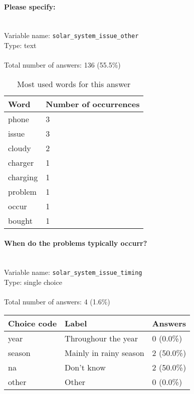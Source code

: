 \documentclass[11.5pt, a4paper]{scrartcl}
\begin{document}
\paragraph{Please specify:}
\  \\Variable name: \texttt{solar\_system\_issue\_other}\\
Type: text\\
\\Total number of answers: 136 (55.5\%)
\\[0.2em]\begin{table}[H]
 \begin{tabular}{p{4cm}|p{8cm}}
Word & Number of occurrences  \\
\hline
\cellcolor{mygray}phone&\cellcolor{mygray}3\\
\hline
issue&3\\
\hline
\cellcolor{mygray}cloudy&\cellcolor{mygray}2\\
\hline
charger&1\\
\hline
\cellcolor{mygray}charging&\cellcolor{mygray}1\\
\hline
problem&1\\
\hline
\cellcolor{mygray}occur&\cellcolor{mygray}1\\
\hline
bought&1\\
\hline
\end{tabular}
\caption{\label{tab:table-name} Most used words for this answer}
\end{table}
\paragraph{When do the problems typically occurr?}
\  \\Variable name: \texttt{solar\_system\_issue\_timing}\\
Type: single choice\\
\\Total number of answers: 4 (1.6\%)
\\[0.2em] \begin{tabular}{p{4cm}|p{8cm}|p{3cm}}
Choice code & Label & Answers \\
\hline
year & Throughour the year& \cellcolor{color0}0 (0.0\%)\\
\cellcolor{mygray} season & \cellcolor{mygray}Mainly in rainy season & \cellcolor{color2}2 (50.0\%)\\
na & Don't know& \cellcolor{color2}2 (50.0\%)\\
\cellcolor{mygray} other & \cellcolor{mygray}Other  & \cellcolor{color0}0 (0.0\%)\\
\end{tabular}
\end{document}

